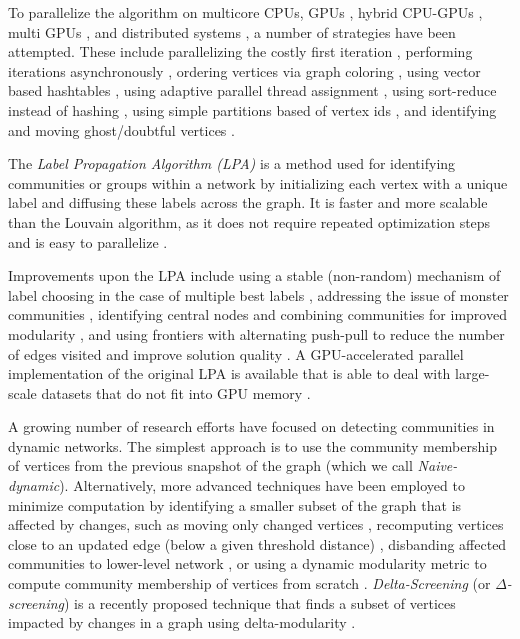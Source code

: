 To parallelize the algorithm on multicore CPUs, GPUs \cite{com-cheong13}, hybrid CPU-GPUs \cite{com-bhowmik19}, multi GPUs \cite{com-cheong13, com-gawande22, com-bhowmick22}, and distributed systems \cite{com-bhowmick22}, a number of strategies have been attempted. These include parallelizing the costly first iteration \cite{com-wickramaarachchi14}, performing iterations asynchronously \cite{com-que15, com-shi21}, ordering vertices via graph coloring \cite{com-halappanavar17}, using vector based hashtables \cite{com-halappanavar17}, using adaptive parallel thread assignment \cite{com-fazlali17, com-naim17, com-mohammadi20}, using sort-reduce instead of hashing \cite{com-cheong13}, using simple partitions based of vertex ids \cite{com-cheong13, com-ghosh18}, and identifying and moving ghost/doubtful vertices \cite{com-zeng15, com-que15, com-bhowmik19, com-bhowmick22}.

The \textit{Label Propagation Algorithm (LPA)} is a method used for identifying communities or groups within a network by initializing each vertex with a unique label and diffusing these labels across the graph. It is faster and more scalable than the Louvain algorithm, as it does not require repeated optimization steps and is easy to parallelize \cite{com-newman04, com-raghavan07}.

Improvements upon the LPA include using a stable (non-random) mechanism of label choosing in the case of multiple best labels \cite{com-xing14}, addressing the issue of monster communities \cite{com-berahmand18, com-sattari18}, identifying central nodes and combining communities for improved modularity \cite{com-you20}, and using frontiers with alternating push-pull to reduce the number of edges visited and improve solution quality \cite{com-liu20}. A GPU-accelerated parallel implementation of the original LPA is available that is able to deal with large-scale datasets that do not fit into GPU memory \cite{com-kozawa17}.

A growing number of research efforts have focused on detecting communities in dynamic networks. The simplest approach is to use the community membership of vertices from the previous snapshot of the graph \cite{com-aynaud10, com-chong13, com-shang14, com-zhuang19} (which we call \textit{Naive-dynamic}). Alternatively, more advanced techniques have been employed to minimize computation by identifying a smaller subset of the graph that is affected by changes, such as moving only changed vertices \cite{com-aktunc15, com-yin16}, recomputing vertices close to an updated edge (below a given threshold distance) \cite{com-held16}, disbanding affected communities to lower-level network \cite{com-cordeiro16}, or using a dynamic modularity metric to compute community membership of vertices from scratch \cite{com-meng16}. \textit{Delta-Screening} (or \textit{$\Delta$-screening}) is a recently proposed technique that finds a subset of vertices impacted by changes in a graph using delta-modularity \cite{com-zarayeneh21}.

